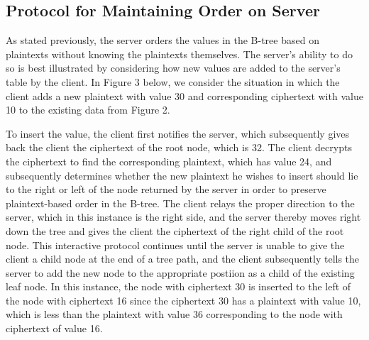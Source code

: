 \documentclass[12pt]{article}
\begin{document}
\subsection{Protocol for Maintaining Order on Server}

As stated previously, the server orders the values in the B-tree based on plaintexts without knowing the plaintexts themselves. The server's ability to do so is best illustrated by considering how new values are added to the server's table by the client. In Figure 3 below, we consider the situation in which the client adds a new plaintext with value 30 and corresponding ciphertext with value 10 to the existing data from Figure 2.

To insert the value, the client first notifies the server, which subsequently gives back the client the ciphertext of the root node, which is 32. The client decrypts the ciphertext to find the corresponding plaintext, which has value 24, and subsequently determines whether the new plaintext he wishes to insert should lie to the right or left of the node returned by the server in order to preserve plaintext-based order in the B-tree. The client relays the proper direction to the server, which in this instance is the right side, and the server thereby moves right down the tree and gives the client the ciphertext of the right child of the root node. This interactive protocol continues until the server is unable to give the client a child node at the end of a tree path, and the client subsequently tells the server to add the new node to the appropriate postiion as a child of the existing leaf node. In this instance, the node with ciphertext 30 is inserted to the left of the node with ciphertext 16 since the ciphertext 30 has a plaintext with value 10, which is less than the plaintext with value 36 corresponding to the node with ciphertext of value 16. 
\end{document}
